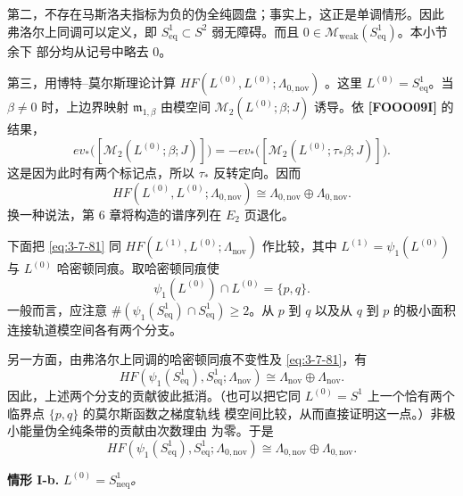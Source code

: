 第二，不存在马斯洛夫指标为负的伪全纯圆盘；事实上，这正是单调情形。因此
弗洛尔上同调可以定义，即
$S^1_{\mathrm{eq}}\subset S^2$ 弱无障碍。而且
$0\in\widehat{\mathcal M}_{\mathrm{weak}}(S^1_{\mathrm{eq}})$。本小节余下
部分均从记号中略去 $0$。

第三，用博特--莫尔斯理论计算
$HF(L^{(0)},L^{(0)};\Lambda_{0,\mathrm{nov}})$
。这里
$L^{(0)}=S^1_{\mathrm{eq}}$。当 $\beta\ne0$ 时，上边界映射
$\mathfrak m_{1,\beta}$ 由模空间
$\mathcal M_2(L^{(0)};\beta;J)$ 诱导。依 \textbf{[FOOO09I]} 的结果，
\[
 ev_*\bigl([\mathcal M_2(L^{(0)};\beta;J)]\bigr)
 =
 -ev_*\bigl([\mathcal M_2(L^{(0)};\tau_*\beta;J)]\bigr).
\]
这是因为此时有两个标记点，所以 $\tau_*$ 反转定向。因而
\begin{equation}
 HF(L^{(0)},L^{(0)};\Lambda_{0,\mathrm{nov}})
 \cong\Lambda_{0,\mathrm{nov}}\oplus\Lambda_{0,\mathrm{nov}}.
\tag{3.7.81}\label{eq:3-7-81}
\end{equation}
换一种说法，第 6 章将构造的谱序列在 $E_2$ 页退化。

下面把 \eqref{eq:3-7-81} 同
$HF(L^{(1)},L^{(0)};\Lambda_{\mathrm{nov}})$ 作比较，其中
$L^{(1)}=\psi_1(L^{(0)})$ 与 $L^{(0)}$ 哈密顿同痕。取哈密顿同痕使
\[
 \psi_1(L^{(0)})\cap L^{(0)}=\{p,q\}.
\]
一般而言，应注意
$\#(\psi_1(S^1_{\mathrm{eq}})\cap S^1_{\mathrm{eq}})\geq2$。从 $p$ 到
$q$ 以及从 $q$ 到 $p$ 的极小面积连接轨道模空间各有两个分支。

另一方面，由弗洛尔上同调的哈密顿同痕不变性及
\eqref{eq:3-7-81}，有
\begin{equation}
 HF(\psi_1(S^1_{\mathrm{eq}}),S^1_{\mathrm{eq}};
 \Lambda_{\mathrm{nov}})
 \cong\Lambda_{\mathrm{nov}}\oplus\Lambda_{\mathrm{nov}}.
\tag{3.7.82.1}\label{eq:3-7-82-1}
\end{equation}
因此，上述两个分支的贡献彼此抵消。（也可以把它同
$L^{(0)}=S^1$ 上一个恰有两个临界点 $\{p,q\}$ 的莫尔斯函数之梯度轨线
模空间比较，从而直接证明这一点。）非极小能量伪全纯条带的贡献由次数理由
为零。于是
\begin{equation}
 HF(\psi_1(S^1_{\mathrm{eq}}),S^1_{\mathrm{eq}};
 \Lambda_{0,\mathrm{nov}})
 \cong\Lambda_{0,\mathrm{nov}}\oplus\Lambda_{0,\mathrm{nov}}.
\tag{3.7.82.2}\label{eq:3-7-82-2}
\end{equation}

\par\medskip
\noindent\textbf{情形 I-b.}\enspace
\textit{$L^{(0)}=S^1_{\mathrm{neq}}$。}

